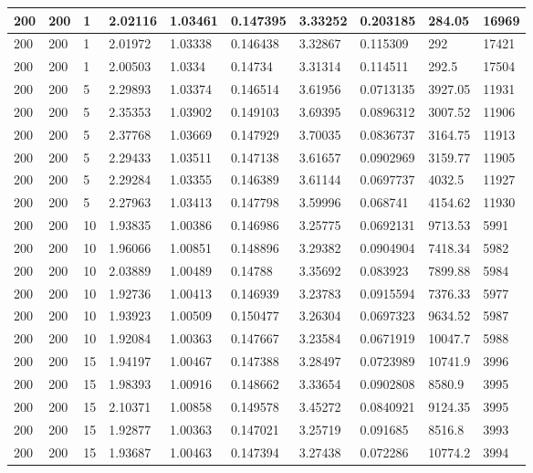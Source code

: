 \begin{landscape}
\begin{longtable}{ | l | l | l | l | l | l | l | l | l | l | }
200 & 200 & 1 & 2.02116 & 1.03461 & 0.147395 & 3.33252 & 0.203185 & 284.05 & 16969\\ \hline
200 & 200 & 1 & 2.01972 & 1.03338 & 0.146438 & 3.32867 & 0.115309 & 292 & 17421\\ \hline
200 & 200 & 1 & 2.00503 & 1.0334 & 0.14734 & 3.31314 & 0.114511 & 292.5 & 17504\\ \hline
200 & 200 & 5 & 2.29893 & 1.03374 & 0.146514 & 3.61956 & 0.0713135 & 3927.05 & 11931\\ \hline
200 & 200 & 5 & 2.35353 & 1.03902 & 0.149103 & 3.69395 & 0.0896312 & 3007.52 & 11906\\ \hline
200 & 200 & 5 & 2.37768 & 1.03669 & 0.147929 & 3.70035 & 0.0836737 & 3164.75 & 11913\\ \hline
200 & 200 & 5 & 2.29433 & 1.03511 & 0.147138 & 3.61657 & 0.0902969 & 3159.77 & 11905\\ \hline
200 & 200 & 5 & 2.29284 & 1.03355 & 0.146389 & 3.61144 & 0.0697737 & 4032.5 & 11927\\ \hline
200 & 200 & 5 & 2.27963 & 1.03413 & 0.147798 & 3.59996 & 0.068741 & 4154.62 & 11930\\ \hline
200 & 200 & 10 & 1.93835 & 1.00386 & 0.146986 & 3.25775 & 0.0692131 & 9713.53 & 5991\\ \hline
200 & 200 & 10 & 1.96066 & 1.00851 & 0.148896 & 3.29382 & 0.0904904 & 7418.34 & 5982\\ \hline
200 & 200 & 10 & 2.03889 & 1.00489 & 0.14788 & 3.35692 & 0.083923 & 7899.88 & 5984\\ \hline
200 & 200 & 10 & 1.92736 & 1.00413 & 0.146939 & 3.23783 & 0.0915594 & 7376.33 & 5977\\ \hline
200 & 200 & 10 & 1.93923 & 1.00509 & 0.150477 & 3.26304 & 0.0697323 & 9634.52 & 5987\\ \hline
200 & 200 & 10 & 1.92084 & 1.00363 & 0.147667 & 3.23584 & 0.0671919 & 10047.7 & 5988\\ \hline
200 & 200 & 15 & 1.94197 & 1.00467 & 0.147388 & 3.28497 & 0.0723989 & 10741.9 & 3996\\ \hline
200 & 200 & 15 & 1.98393 & 1.00916 & 0.148662 & 3.33654 & 0.0902808 & 8580.9 & 3995\\ \hline
200 & 200 & 15 & 2.10371 & 1.00858 & 0.149578 & 3.45272 & 0.0840921 & 9124.35 & 3995\\ \hline
200 & 200 & 15 & 1.92877 & 1.00363 & 0.147021 & 3.25719 & 0.091685 & 8516.8 & 3993\\ \hline
200 & 200 & 15 & 1.93687 & 1.00463 & 0.147394 & 3.27438 & 0.072286 & 10774.2 & 3994\\ \hline

\end{longtable}
\end{landscape}
